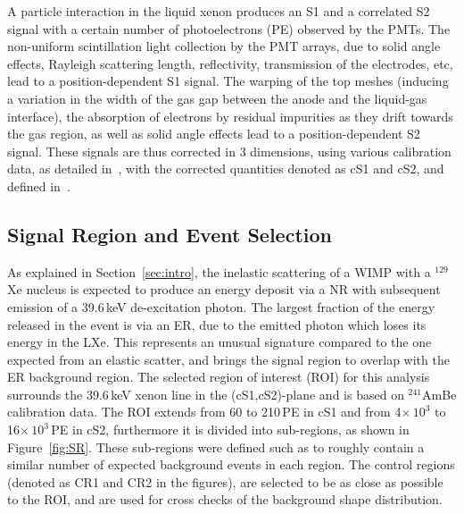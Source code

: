 A particle interaction in the liquid xenon produces an S1 and a correlated S2 signal with a certain number of photoelectrons (PE) observed by the PMTs. The non-uniform scintillation light collection by the PMT arrays, due to solid angle effects, Rayleigh scattering length, reflectivity, transmission of the electrodes, etc, lead to a position-dependent S1 signal. The warping of the top meshes (inducing a variation in the width of the gas gap between the anode and the liquid-gas interface), the absorption of electrons by residual impurities as they drift towards the gas region, as well as solid angle effects lead to a position-dependent S2 signal. These signals are thus corrected in 3 dimensions, using various calibration data, as detailed in~\cite{Aprile:2011dd,Aprile:2012vw}, with the corrected quantities denoted as cS1 and cS2, and defined in~\cite{Aprile:2012vw}. 

\subsection{Signal Region and Event Selection} 

As explained in Section~\ref{sec:intro}, the inelastic scattering of a WIMP with a $^{129}$Xe nucleus is expected to produce an energy deposit via a NR with subsequent emission of  
a 39.6\,keV de-excitation photon. The largest fraction of the energy released in the event is via an ER, due to the emitted photon which loses its energy in the LXe.
This represents an unusual signature compared to the one expected from an elastic scatter, and brings the signal region to overlap with the ER background region.
The selected region of interest (ROI) for this analysis surrounds the 39.6\,keV xenon line in the (cS1,cS2)-plane 
and is based on $^{241}$AmBe calibration data. The ROI extends from 60 to 210\,PE in cS1 and from 4$\times \, 10^3$ to 16$\times \, 10^3$\,PE in cS2, furthermore it is divided  into sub-regions, as shown in Figure~\ref{fig:SR}.  These sub-regions were defined such as to roughly contain a similar number of expected background events in each region. The control regions (denoted as CR1 and CR2 in the figures), are selected to be as close as possible to the ROI,  and are used for cross checks of the background shape distribution.

